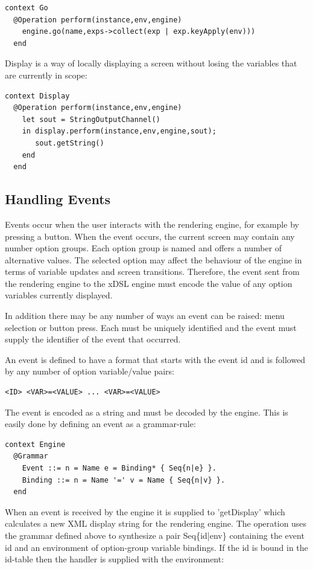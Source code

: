 \begin{lstlisting}
context Go
  @Operation perform(instance,env,engine)
    engine.go(name,exps->collect(exp | exp.keyApply(env)))
  end
\end{lstlisting}Display is a way of locally displaying a screen without losing the
variables that are currently in scope:

\begin{lstlisting}
context Display
  @Operation perform(instance,env,engine)
    let sout = StringOutputChannel()
    in display.perform(instance,env,engine,sout);
       sout.getString()
    end
  end
\end{lstlisting}
\subsection{Handling Events}

Events occur when the user interacts with the rendering engine, for
example by pressing a button. When the event occurs, the current screen
may contain any number option groups. Each option group is named and
offers a number of alternative values. The selected option may affect
the behaviour of the engine in terms of variable updates and screen
transitions. Therefore, the event sent from the rendering engine to
the xDSL engine must encode the value of any option variables currently
displayed.

In addition there may be any number of ways an event can be raised:
menu selection or button press. Each must be uniquely identified and
the event must supply the identifier of the event that occurred. 

An event is defined to have a format that starts with the event id
and is followed by any number of option variable/value pairs:

\begin{lstlisting}
<ID> <VAR>=<VALUE> ... <VAR>=<VALUE>
\end{lstlisting}The event is encoded as a string and must be decoded by the engine.
This is easily done by defining an event as a grammar-rule:

\begin{lstlisting}
context Engine
  @Grammar
    Event ::= n = Name e = Binding* { Seq{n|e} }.
    Binding ::= n = Name '=' v = Name { Seq{n|v} }.
  end
\end{lstlisting}When an event is received by the engine it is supplied to 'getDisplay'
which calculates a new XML display string for the rendering engine.
The operation uses the grammar defined above to synthesize a pair
Seq\{id|env\} containing the event id and an environment of option-group
variable bindings. If the id is bound in the id-table then the handler
is supplied with the environment:

